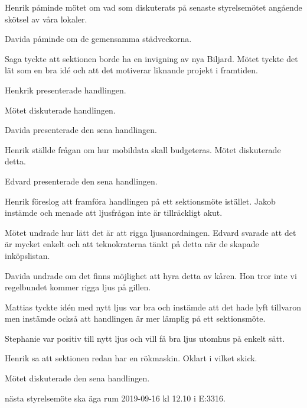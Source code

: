 \documentclass[10pt]{article}
\begin{document}
\begin{paragrafer}
Henrik påminde mötet om vad som diskuterats på senaste styrelsemötet angående skötsel av våra lokaler. 

Davida påminde om de gemensamma städveckorna. 

Saga tyckte att sektionen borde ha en invigning av nya Biljard. Mötet tyckte det lät som en bra idé och att det motiverar liknande projekt i framtiden. 

Henkrik presenterade handlingen.

Mötet diskuterade handlingen.

\Mbabay

Davida presenterade den sena handlingen.

Henrik ställde frågan om hur mobildata skall budgeteras. Mötet diskuterade detta. 

\Mbabay


Edvard presenterade den sena handlingen.

Henrik föreslog att framföra handlingen på ett sektionsmöte istället. Jakob instämde och menade att ljusfrågan inte är tillräckligt akut. 

Mötet undrade hur lätt det är att rigga ljusanordningen. Edvard svarade att det är mycket enkelt och att teknokraterna tänkt på detta när de skapade inköpslistan. 

Davida undrade om det finns möjlighet att hyra detta av kåren. Hon tror inte vi regelbundet kommer rigga ljus på gillen.

Mattias tyckte idén med nytt ljus var bra och instämde att det hade lyft tillvaron men instämde också att handlingen är mer lämplig på ett sektionsmöte. 

Stephanie var positiv till nytt ljus och vill få bra ljus utomhus på enkelt sätt.

Henrik sa att sektionen redan har en rökmaskin. Oklart i vilket skick.  

Mötet diskuterade den sena handlingen. 

\Mbaay

\Mba nästa styrelsemöte ska äga rum 2019-09-16 kl 12.10 i E:3316.



\end{paragrafer}
\end{document}
